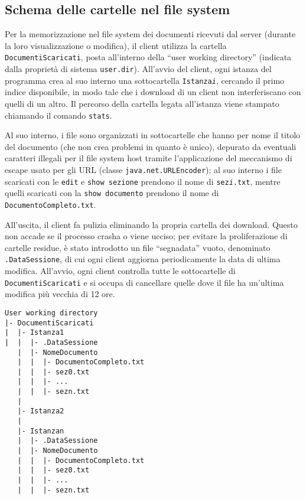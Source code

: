 \documentclass[a4paper,12pt]{article}
\begin{document}
 \subsection{ Schema delle cartelle nel file system }
 Per la memorizzazione nel file system dei documenti ricevuti dal server (durante la loro visualizzazione o modifica), il client utilizza la cartella \texttt{DocumentiScaricati}, posta all'interno della ``user working directory'' (indicata dalla proprietà di sistema \texttt{user.dir}). All'avvio del client, ogni istanza del programma crea al suo interno una sottocartella \texttt{Istanza\textit{i}}, cercando il primo indice disponibile, in modo tale che i download di un client non interferiscano con quelli di un altro. Il percorso della cartella legata all'istanza viene stampato chiamando il comando \texttt{stats}.
 
 Al suo interno, i file sono organizzati in sottocartelle che hanno per nome il titolo del documento (che non crea problemi in quanto è unico), depurato da eventuali caratteri illegali per il file system host tramite l'applicazione del meccanismo di escape usato per gli URL (classe \texttt{java.net.URLEncoder}); al suo interno i file scaricati con le \texttt{edit} e \texttt{show sezione} prendono il nome di \texttt{sez\textit{i}.txt}, mentre quelli scaricati con la \texttt{show documento} prendono il nome di \texttt{DocumentoCompleto.txt}.
 
 All'uscita, il client fa pulizia eliminando la propria cartella dei download. Questo non accade se il processo crasha o viene ucciso; per evitare la proliferazione di cartelle residue, è stato introdotto un file ``segnadata'' vuoto, denominato \texttt{.DataSessione}, di cui ogni client aggiorna periodicamente la data di ultima modifica. All'avvio, ogni client controlla tutte le sottocartelle di \texttt{DocumentiScaricati} e si occupa di cancellare quelle dove il file ha un'ultima modifica più vecchia di 12 ore.
 
 \begin{verbatim}
User working directory
|- DocumentiScaricati
|  |- Istanza1
|  |  |- .DataSessione
   |  |- NomeDocumento
   |  |  |- DocumentoCompleto.txt
   |  |  |- sez0.txt
   |  |  |- ...
   |  |  |- sezn.txt
   |
   |- Istanza2
   |
   |- Istanzan
   |  |- .DataSessione
   |  |- NomeDocumento
   |  |  |- DocumentoCompleto.txt
   |  |  |- sez0.txt
   |  |  |- ...
   |  |  |- sezn.txt
 \end{verbatim}

 
\end{document}
